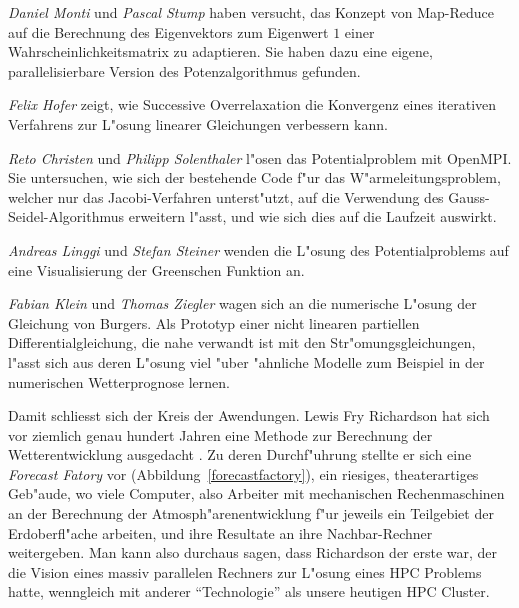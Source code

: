 \begin{refsection}
{\em Daniel Monti} und {\em Pascal Stump} haben versucht, das Konzept
von Map-Reduce auf die Berechnung des Eigenvektors zum Eigenwert $1$
einer Wahrscheinlichkeitsmatrix zu adaptieren. Sie haben dazu eine eigene,
parallelisierbare Version des Potenzalgorithmus gefunden.

{\em Felix Hofer} zeigt, wie Successive Overrelaxation die
Konvergenz eines iterativen Verfahrens zur L"osung linearer Gleichungen
verbessern kann.

{\em Reto Christen} und {\em Philipp Solenthaler} l"osen das Potentialproblem
mit OpenMPI. Sie untersuchen, wie sich der bestehende Code f"ur das
W"armeleitungsproblem, welcher nur das Jacobi-Verfahren unterst"utzt,
auf die Verwendung des Gauss-Seidel-Algorithmus erweitern l"asst, und
wie sich dies auf die Laufzeit auswirkt.

{\em Andreas Linggi} und {\em Stefan Steiner} wenden die L"osung des
Potentialproblems auf eine Visualisierung der Greenschen Funktion an.

{\em Fabian Klein} und {\em Thomas Ziegler} wagen sich an die numerische
L"osung der Gleichung von Burgers. Als Prototyp einer nicht linearen
partiellen Differentialgleichung, die nahe verwandt ist mit den
Str"omungsgleichungen, l"asst sich aus deren L"osung viel "uber "ahnliche
Modelle zum Beispiel in der numerischen Wetterprognose lernen.

Damit schliesst sich der Kreis der Awendungen. Lewis Fry Richardson hat
sich vor ziemlich genau hundert Jahren eine Methode zur Berechnung der
Wetterentwicklung ausgedacht \cite{skript:richardson}.
Zu deren Durchf"uhrung stellte er sich
eine {\em Forecast Fatory} vor (Abbildung~\ref{forecastfactory}),
ein riesiges, theaterartiges Geb"aude,
wo viele Computer, also Arbeiter mit mechanischen Rechenmaschinen an der
Berechnung der Atmosph"arenentwicklung f"ur jeweils ein Teilgebiet
der Erdoberfl"ache arbeiten,
und ihre Resultate an ihre Nachbar-Rechner weitergeben. 
Man kann also durchaus sagen, dass Richardson der erste war, der die Vision
eines massiv parallelen Rechners zur L"osung eines HPC Problems hatte,
wenngleich mit anderer ``Technologie'' als unsere heutigen HPC Cluster.


\end{refsection}
